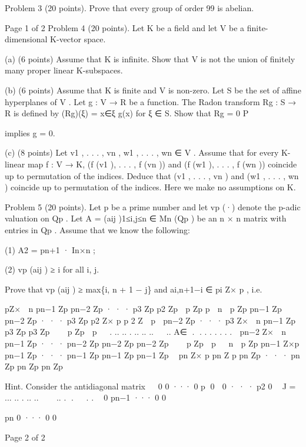 \documentclass[UTF8,12pt]{ctexart}
\begin{document}
Problem 3 (20 points). Prove that every group of order 99 is abelian.

Page 1 of 2 Problem 4 (20 points). Let K be a field and let V be a finite-dimensional K-vector space.

(a) (6 points) Assume that K is infinite. Show that V is not the union of finitely many proper linear K-subspaces.

(b) (6 points) Assume that K is finite and V is non-zero. Let S be the set of affine hyperplanes of V . Let g : V → R be a function. The Radon transform Rg : S → R is defined by (Rg)(ξ) = x∈ξ g(x) for ξ ∈ S. Show that Rg = 0 P

implies g = 0.

(c) (8 points) Let v1 , . . . , vn , w1 , . . . , wn ∈ V . Assume that for every K-linear map f : V → K, (f (v1 ), . . . , f (vn )) and (f (w1 ), . . . , f (wn )) coincide up to permutation of the indices. Deduce that (v1 , . . . , vn ) and (w1 , . . . , wn ) coincide up to permutation of the indices. Here we make no assumptions on K.

Problem 5 (20 points). Let p be a prime number and let vp (·) denote the p-adic valuation on Qp . Let A = (aij )1≤i,j≤n ∈ Mn (Qp ) be an n × n matrix with entries in Qp . Assume that we know the following:

(1) A2 = pn+1 · In×n ;

(2) vp (aij ) ≥ i for all i, j.

Prove that vp (aij ) ≥ max\{i, n + 1 − j\} and ai,n+1−i ∈ pi Z× p , i.e.

pZ×  n pn−1 Zp pn−2 Zp · · · p3 Zp p2 Zp  p Zp p  n  p Zp pn−1 Zp pn−2 Zp · · · p3 Zp p2 Z× p p 2 Z  p  pn−2 Zp · · · p3 Z×  n pn−1 Zp p3 Zp p3 Zp    p Zp  p   . .. .. . .. .. ..   .. A∈ . . . . . . . .  pn−2 Z×  n pn−1 Zp · · · pn−2 Zp pn−2 Zp pn−2 Zp    p Zp  p   n  p Zp pn−1 Z×p pn−1 Zp · · · pn−1 Zp pn−1 Zp pn−1 Zp  pn Z× p pn Z p pn Zp · · · pn Zp pn Zp pn Zp

Hint. Consider the antidiagonal matrix   0 0 ··· 0 p 0  0 · · · p2 0  J =  ... .. . .. ..    .. . .   . .  0 pn−1 ··· 0 0  

pn 0 ··· 0 0

Page 2 of 2
\end{document}
